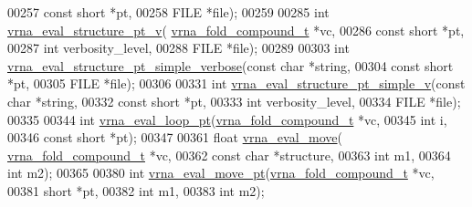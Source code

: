 \begin{DoxyCode}
00257                                     \textcolor{keyword}{const} \textcolor{keywordtype}{short} *pt,
00258                                     FILE *file);
00259 
00285 \textcolor{keywordtype}{int} \hyperlink{eval_8h_a2c6533ba0afe4c88d335d8f1e0e2a48e}{vrna\_eval\_structure\_pt\_v}( \hyperlink{group__fold__compound_structvrna__fc__s}{vrna\_fold\_compound\_t} *vc,
00286                               \textcolor{keyword}{const} \textcolor{keywordtype}{short} *pt,
00287                               \textcolor{keywordtype}{int} verbosity\_level,
00288                               FILE *file);
00289 
00303 \textcolor{keywordtype}{int} \hyperlink{eval_8h_a76e152ee9a02be23da14cdddf52b4e44}{vrna\_eval\_structure\_pt\_simple\_verbose}(\textcolor{keyword}{const} \textcolor{keywordtype}{char} *\textcolor{keywordtype}{string},
00304                                           \textcolor{keyword}{const} \textcolor{keywordtype}{short} *pt,
00305                                           FILE *file);
00306 
00331 \textcolor{keywordtype}{int} \hyperlink{eval_8h_ac40b813d35289da9816d0c1eec94faa5}{vrna\_eval\_structure\_pt\_simple\_v}(\textcolor{keyword}{const} \textcolor{keywordtype}{char} *\textcolor{keywordtype}{string},
00332                                     \textcolor{keyword}{const} \textcolor{keywordtype}{short} *pt,
00333                                     \textcolor{keywordtype}{int} verbosity\_level,
00334                                     FILE *file);
00335 
00344 \textcolor{keywordtype}{int} \hyperlink{eval_8h_a730ba4df55c02fd530a0cddd49faf760}{vrna\_eval\_loop\_pt}(\hyperlink{group__fold__compound_structvrna__fc__s}{vrna\_fold\_compound\_t} *vc,
00345                       \textcolor{keywordtype}{int} i,
00346                       \textcolor{keyword}{const} \textcolor{keywordtype}{short} *pt);
00347 
00361 \textcolor{keywordtype}{float} \hyperlink{eval_8h_aff1b9e4f4d17b434b0a822fe783672c1}{vrna\_eval\_move}( \hyperlink{group__fold__compound_structvrna__fc__s}{vrna\_fold\_compound\_t} *vc,
00362                       \textcolor{keyword}{const} \textcolor{keywordtype}{char} *structure,
00363                       \textcolor{keywordtype}{int} m1,
00364                       \textcolor{keywordtype}{int} m2);
00365 
00380 \textcolor{keywordtype}{int} \hyperlink{eval_8h_a123dabc119ea98c968a5e903cc46f0fb}{vrna\_eval\_move\_pt}(\hyperlink{group__fold__compound_structvrna__fc__s}{vrna\_fold\_compound\_t} *vc,
00381                       \textcolor{keywordtype}{short} *pt,
00382                       \textcolor{keywordtype}{int} m1,
00383                       \textcolor{keywordtype}{int} m2);

\end{DoxyCode}
